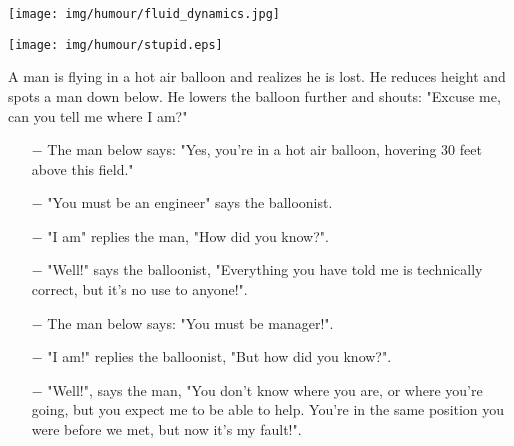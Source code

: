 \begin{center}\underline{\hspace{5 cm}}\end{center}
	\begin{center}
	\texttt{[image: img/humour/fluid\_dynamics.jpg]}
	\end{center}

	\begin{center}
	\texttt{[image: img/humour/stupid.eps]}
	\end{center}
\begin{center}\underline{\hspace{5 cm}}\end{center}

A man is flying in a hot air balloon and realizes he is lost. He reduces height and spots a man down below. He lowers the balloon further and shouts: "Excuse me, can you tell me where I am?" 
\begin{itemize}
	\item[$-$] The man below says: "Yes, you're in a hot air balloon, hovering 30 feet above this field." 

	\item[$-$] "You must be an engineer" says the balloonist. 

	\item[$-$] "I am" replies the man, "How did you know?".

	\item[$-$] "Well!" says the balloonist, "Everything you have told me is technically correct, but it's no use to anyone!". 

	\item[$-$] The man below says: "You must be manager!". 

	\item[$-$] "I am!" replies the balloonist, "But how did you know?".

	\item[$-$] "Well!", says the man, "You don't know where you are, or where you're going, but you expect me to be able to help. You're in the same position you were before we met, but now it's my fault!". 
\end{itemize}
\begin{center}\underline{\hspace{5 cm}}\end{center}

